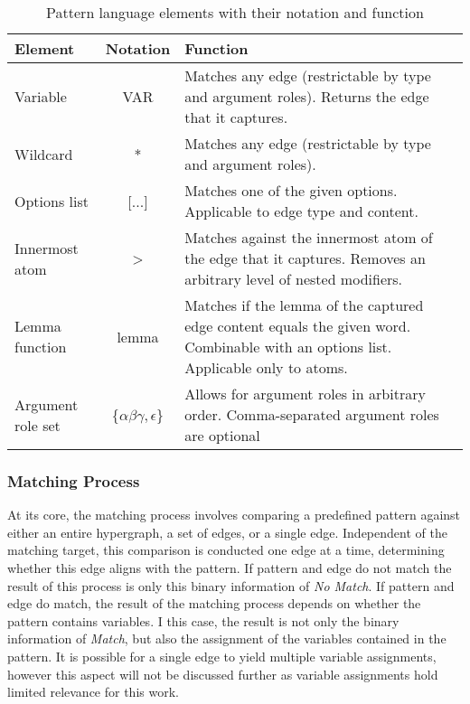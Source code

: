 \documentclass[11pt]{scrreprt}
\begin{document}
\begin{table}[h]
\centering
\begin{tabular}{lcp{9cm}}
\toprule
\textbf{Element} & \textbf{Notation} & \textbf{Function} \\
\midrule
Variable & \textsf{VAR} & Matches any edge (restrictable by type and argument roles). Returns the edge that it captures. \\
Wildcard & \textsf{*} & Matches any edge (restrictable by type and argument roles). \\
Options list & \textsf{[...]} & Matches one of the given options. Applicable to edge type and content. \\
Innermost atom & \textsf{>} & Matches against the innermost atom of the edge that it captures. Removes an arbitrary level of nested modifiers. \\
Lemma function & \textsf{lemma} & Matches if the lemma of the captured edge content equals the given word. Combinable with an options list. Applicable only to atoms. \\
Argument role set & \textsf{\{\(\alpha\beta\gamma, \epsilon\)\}} & Allows for argument roles in arbitrary order. Comma-separated argument roles are optional \\
\bottomrule
\end{tabular}
\caption{Pattern language elements with their notation and function}
\label{tab:pattern-language-elements}
\end{table}

\subsubsection{Matching Process}
\label{sec:pattern-matching-process}
At its core, the matching process involves comparing a predefined pattern against either an entire hypergraph, a set of edges, or a single edge. Independent of the matching target, this comparison is conducted one edge at a time, determining whether this edge aligns with the pattern. If pattern and edge do not match the result of this process is only this binary information of \textit{No Match}. If pattern and edge do match, the result of the matching process depends on whether the pattern contains variables. I this case, the result is not only the binary information of \textit{Match}, but also the assignment of the variables contained in the pattern. It is possible for a single edge to yield multiple variable assignments, however this aspect will not be discussed further as variable assignments hold limited relevance for this work. 
\end{document}
